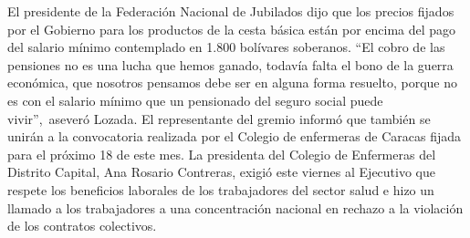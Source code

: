 \documentclass{article}%
\begin{document}
\newline%
%
El presidente de la Federación Nacional de Jubilados dijo que los precios fijados por el Gobierno para los productos de la cesta básica están por encima del pago del salario mínimo contemplado en  1.800 bolívares soberanos.%
\newline%
%
“El cobro de las pensiones no es una lucha que hemos ganado, todavía falta el bono de la guerra económica, que nosotros pensamos debe ser en alguna forma resuelto, porque no es con el salario mínimo que un pensionado del seguro social puede vivir”,~aseveró Lozada.%
\newline%
%
El representante del gremio informó que también se unirán a la convocatoria realizada por el Colegio de enfermeras de Caracas fijada para el próximo 18 de este mes.%
\newline%
%
La presidenta del Colegio de Enfermeras del Distrito Capital, Ana Rosario Contreras, exigió este viernes al Ejecutivo que respete los beneficios laborales de los trabajadores del sector salud e hizo un llamado a los trabajadores a una concentración nacional en rechazo a la violación de los contratos colectivos.%
\newline%
%
\end{document}
